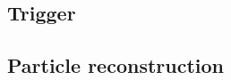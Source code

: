 \subsection{Trigger} \label{subsec-Trigger}

\subsection{Particle reconstruction} \label{subsec-ParticleReconstruction}
